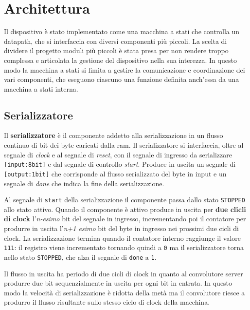 \documentclass[a4paper]{report}
\begin{document}
\chapter{Architettura}
Il dispositivo è stato implementato come una macchina a stati che controlla un datapath, che si interfaccia con diversi componenti più piccoli. La scelta di dividere il progetto moduli più piccoli è stata presa per non rendere troppo complessa e articolata la gestione del dispositivo nella sua interezza. In questo modo la macchina a stati si limita a gestire la comunicazione e coordinazione dei vari componenti, che eseguono ciascuno una funzione definita anch'essa da una macchina a stati interna.

\section{Serializzatore}

Il \textbf{serializzatore} è il componente addetto alla serializzazione in un flusso continuo di bit dei byte caricati dalla ram.
Il serializzatore si interfaccia, oltre al segnale di \textit{clock} e al segnale di \textit{reset}, con il segnale di ingresso da serializzare \texttt{[input:8bit]} e dal segnale di controllo \textit{start}. Produce in uscita un segnale di \texttt{[output:1bit]} che corrisponde al flusso serializzato del byte in input e un segnale di \textit{done} che indica la fine della serializzazione.

Al segnale di \texttt{start} della serializzazione il componente passa dallo stato \texttt{STOPPED} allo stato attivo. Quando il componente è attivo produce in uscita per \textbf{due clicli di clock} l'\textit{n-esimo} bit del segnale in ingresso, incrementando poi il contatore per produrre in uscita l'\textit{n+1 esimo} bit del byte in ingresso nei prossimi due cicli di clock. La serializzazione termina quando il contatore interno raggiunge il valore \texttt{111}: il registro viene incrementato tornando quindi a \texttt{0} ma il serializzatore torna nello stato \texttt{STOPPED}, che alza il segnale di \texttt{done} a \texttt{1}.

Il flusso in uscita ha periodo di due cicli di clock in quanto al convolutore server produrre due bit sequenzialmente in uscita per ogni bit in entrata. In questo modo la velocità di serializzazione è ridotta della metà ma il convolutore riesce a produrro il flusso risultante sullo stesso ciclo di clock della macchina.
\end{document}
